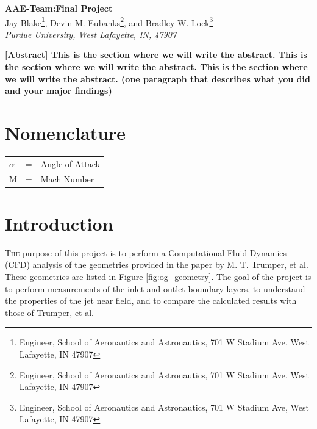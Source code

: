 \documentclass[12pt]{article} %
\title{\classnumber\:\reportnumber}
\author{Jay Blake\\Devin Eubanks\\Brad Lock\\Purdue University}
\newcommand{\classnumber}{AAE\:412\:-\:Team\:32:}
\newcommand{\reportnumber}{Final Project}
\begin{document}
\maketitle
\clearpage
\begin{center}
{\Large\textbf{\classnumber\:\reportnumber}}\\
\vspace*{24pt}
Jay Blake\footnote{Engineer, School of Aeronautics and Astronautics, 701 W Stadium Ave, West Lafayette, IN 47907}, Devin M. Eubanks\footnote{Engineer, School of Aeronautics and Astronautics, 701 W Stadium Ave, West Lafayette, IN 47907}, and Bradley W. Lock\footnote{Engineer, School of Aeronautics and Astronautics, 701 W Stadium Ave, West Lafayette, IN 47907}\\
\textit{Purdue University, West Lafayette, IN, 47907}
\end{center}
\vspace*{48pt}
\textbf{\hspace{36pt}[Abstract] This is the section where we will write the abstract. This is the section where we will write the abstract. This is the section where we will write the abstract. (one paragraph that describes what you
did and your major findings)}
\vspace*{48pt}
\section*{Nomenclature}
\begin{table}[ht]
    \begin{tabular}{l c l}
       $\alpha$&=&Angle of Attack\\
         M&=&Mach Number
    \end{tabular}
    \label{tab:nomenclature}
\end{table}

\section{Introduction}
\lettrine{T}{he} purpose of this project is to perform a Computational Fluid Dynamics (CFD) analysis of the geometries provided in the paper by M. T. Trumper, et al. \cite{MilesT.Trumper2018IoNE} These geometries are listed in Figure \ref{fig:og_geometry}. The goal of the project is to perform measurements of the inlet and outlet boundary layers, to understand the properties of the jet near field, and to compare the calculated results with those of Trumper, et al.
\end{document}
